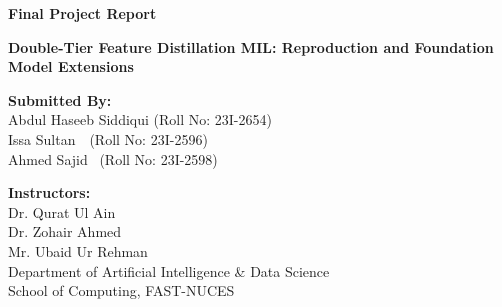 \documentclass[12pt, a4paper]{article}
\begin{document}
\begin{titlepage}
    \begin{center}
        \vspace*{2cm}
        
        \Huge
        \textbf{\textcolor{primary}{Final Project Report}}
        
        \vspace{0.5cm}
        \LARGE
        \textbf{Double-Tier Feature Distillation MIL: Reproduction and Foundation Model Extensions}
        
        \vspace{2cm}
        
        \textbf{Submitted By:}\\
        \vspace{0.5cm}
        \Large
        Abdul Haseeb Siddiqui \quad (Roll No: 23I-2654) \\
        Issa Sultan \quad\quad\quad\quad\,\, (Roll No: 23I-2596) \\
        Ahmed Sajid \quad\quad\quad\quad\, (Roll No: 23I-2598) \\
        
        \vfill
        
        \Large
        \textbf{Instructors:}\\
        Dr. Qurat Ul Ain \\
        Dr. Zohair Ahmed \\
        Mr. Ubaid Ur Rehman \\
        \vspace{1cm}
        Department of Artificial Intelligence \& Data Science\\
        School of Computing, FAST-NUCES\\
        \vspace{0.8cm}
        
    \end{center}
\end{titlepage}


\begin{abstract}
\noindent Processing Whole Slide Images (WSIs) is notoriously difficult in deep learning because the files are just too large to fit into GPU memory. While Multiple Instance Learning (MIL) helps break these images into smaller patches, most current models still depend on basic ImageNet features and struggles when tumor patches are rare. In this project, our group started by reproducing the Double-Tier Feature Distillation MIL (DTFD-MIL) baseline. We verified their claims on CAMELYON-16 and TCGA-Lung, getting the expected 0.946 AUC. Moving past the baseline, we designed a custom extension using two foundation models. We swapped the old ResNet extractor for Pathology Language-Image Pretraining (PLIP) to get actual medical embeddings, and we used Meta's Segment Anything Model (SAM) to cluster patches logically rather than just splitting them randomly. Even though we had to shrink our dataset heavily due to local hardware limits crashing during SAM inference, our new pipeline still manage to beat a standard ResNet setup under the same data-starved conditions by an AUC margin of +0.208.
\end{abstract}
\end{document}
